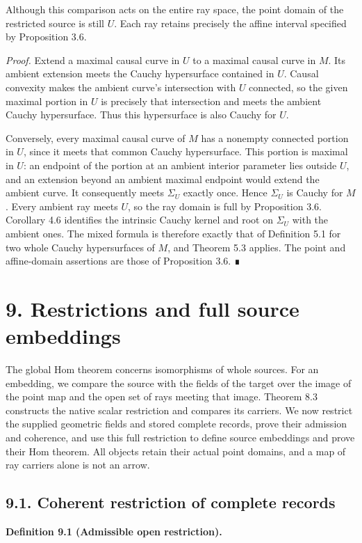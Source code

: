 \documentclass[
  english,
  11pt,
  reqno]{amsart}
\makeatletter
\newcounter{none} %
\newcommand{\paperdisplaynext}{%
  \let\paper@savedstartsection\@startsection
  \def\@startsection##1##2##3##4##5##6{%
    \let\@startsection\paper@savedstartsection
    \@tempskipa ##5\relax
    \ifdim\@tempskipa<\z@
      \def\paper@afterskip{.35\baselineskip}%
    \else
      \def\paper@afterskip{##5}%
    \fi
    \@startsection{##1}{##2}{##3}{##4}{\paper@afterskip}{##6}}}
\newcommand{\paperdisplaysection}{\paperdisplaynext\subsection}
\newcommand{\pandocstatementheading}[1]{%
  \par\if@nobreak\else
    \addpenalty{\@beginparpenalty}%
    \addvspace{.5\baselineskip plus .2\baselineskip minus .2\baselineskip}%
  \fi
  {\normalfont\bfseries #1\par}%
  \nobreak\@afterindenttrue\@afterheading
}
\makeatother
\begin{document}
Although this comparison acts on the entire ray space, the point domain
of the restricted source is still \(U\). Each ray retains precisely the
affine interval specified by Proposition 3.6.

\emph{Proof.} Extend a maximal causal curve in \(U\) to a maximal causal
curve in \(M\). Its ambient extension meets the Cauchy hypersurface
contained in \(U\). Causal convexity makes the ambient curve's
intersection with \(U\) connected, so the given maximal portion in \(U\)
is precisely that intersection and meets the ambient Cauchy
hypersurface. Thus this hypersurface is also Cauchy for \(U\).

Conversely, every maximal causal curve of \(M\) has a nonempty connected
portion in \(U\), since it meets that common Cauchy hypersurface. This
portion is maximal in \(U\): an endpoint of the portion at an ambient
interior parameter lies outside \(U\), and an extension beyond an
ambient maximal endpoint would extend the ambient curve. It consequently
meets \(\Sigma_U\) exactly once. Hence \(\Sigma_U\) is Cauchy for \(M\).
Every ambient ray meets \(U\), so the ray domain is full by Proposition
3.6. Corollary 4.6 identifies the intrinsic Cauchy kernel and root on
\(\Sigma_U\) with the ambient ones. The mixed formula is therefore
exactly that of Definition 5.1 for two whole Cauchy hypersurfaces of
\(M\), and Theorem 5.3 applies. The point and affine-domain assertions
are those of Proposition 3.6. ∎

\protect{}\label{sec:global-source-open-embeddings}

\section{9. Restrictions and full source
embeddings}\label{restrictions-and-full-source-embeddings}

The global Hom theorem concerns isomorphisms of whole sources. For an
embedding, we compare the source with the fields of the target over the
image of the point map and the open set of rays meeting that image.
Theorem 8.3 constructs the native scalar restriction and compares its
carriers. We now restrict the supplied geometric fields and stored
complete records, prove their admission and coherence, and use this full
restriction to define source embeddings and prove their Hom theorem. All
objects retain their actual point domains, and a map of ray carriers
alone is not an arrow.

\protect{}\label{sec:global-source-restriction-coherence}
\paperdisplaysection{9.1. Coherent restriction of complete
records}\label{coherent-restriction-of-complete-records}
\pandocstatementheading{\protect{}\label{def:global-admissible-source-open}Definition 9.1 (Admissible open restriction).}
\end{document}
